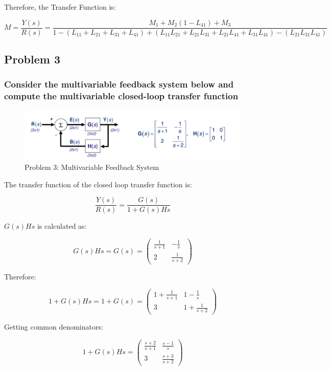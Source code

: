 \documentclass[12pt, letterpaper]{../assignment}
\begin{document}
Therefore, the Transfer Function is:
{\footnotesize
\begin{answer}
$$ M = \frac{Y(s)}{R(s)} = \frac{M_1 + M_2 (1 - L_{41}) + M_3}{1 - (L_{11}+L_{21}+L_{31}+L_{41}) + (L_{11}L_{21} + L_{21}L_{31} + L_{21}L_{41} + L_{31}L_{41} ) - (L_{21} L_{31} L_{41})} $$
\end{answer}
}

\subsection*{Problem 3}
\subsubsection*{Consider the multivariable feedback system below and compute the multivariable closed-loop transfer function}

\begin{figure}[H]
    \centering
    \includegraphics[scale=0.4]{figures/mutivar_feedback_system.png}
    \caption{Problem 3: Multivariable Feedback System}
    \label{Fig:mvfs}
\end{figure}

The transfer function of the closed loop transfer function is:

$$\frac{Y(s)}{R(s)} = \frac{G(s)}{1+G(s)H{s}} $$

$G(s)H{s}$ is calculated as:

$$G(s)H{s} = G(s) = \left(\begin{array}{cc} \frac{1}{s+1} & -\frac{1}{s}\\ 2 & \frac{1}{s+2} \end{array}\right)$$

Therefore:

$$ 1 + G(s)H{s} = 1 + G(s) = \left(\begin{array}{cc} 1 + \frac{1}{s+1} & 1-\frac{1}{s}\\ 3 & 1 + \frac{1}{s+2} \end{array}\right) $$

Getting common denominators:

$$ 1 + G(s)H{s} = \left(\begin{array}{cc} \frac{s+2}{s+1} & \frac{s-1}{s}\\ 3 & \frac{s+3}{s+2} \end{array}\right) $$
\end{document}

